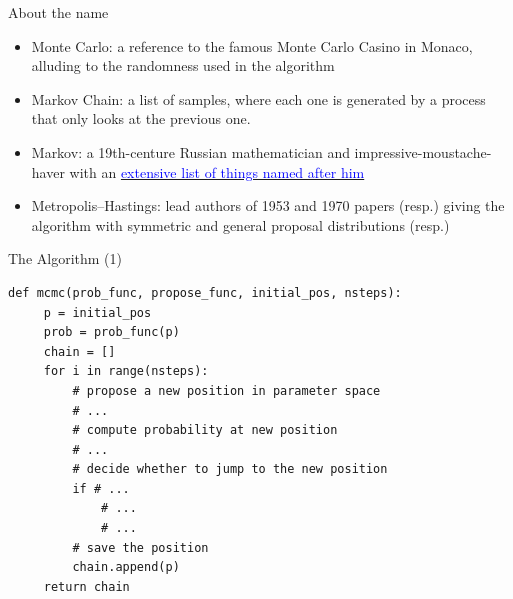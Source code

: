 \documentclass{beamer}
\newcommand{\dfmpage}[1]{
{
\setbeamercolor{background canvas}{bg=}

}
}
\begin{document}
\dfmpage{36-45}


\begin{frame}{About the name}
\begin{itemize}
\item \alert{Monte Carlo}: a reference to the famous Monte Carlo Casino in Monaco, alluding to the randomness used in the algorithm
\item \alert{Markov Chain}: a list of samples, where each one is generated by a process that only looks at the previous one.
\item \alert{Markov}: a 19th-centure Russian mathematician and impressive-moustache-haver
with an \href{https://en.wikipedia.org/wiki/List_of_things_named_after_Andrey_Markov}{\textcolor{blue}{extensive list of things named after him}}
\item \alert{Metropolis--Hastings}: lead authors of 1953 and 1970 papers (resp.) giving the algorithm with symmetric and general proposal distributions (resp.)
\end{itemize}
\end{frame}


\begin{frame}[fragile]{The Algorithm (1)}
\begin{small}
\begin{verbatim}
def mcmc(prob_func, propose_func, initial_pos, nsteps):
     p = initial_pos
     prob = prob_func(p)
     chain = []
     for i in range(nsteps):
         # propose a new position in parameter space
         # ...
         # compute probability at new position
         # ...
         # decide whether to jump to the new position
         if # ...
             # ...
             # ...
         # save the position
         chain.append(p)
     return chain
\end{verbatim}
\end{small}
\end{frame}
\end{document}
